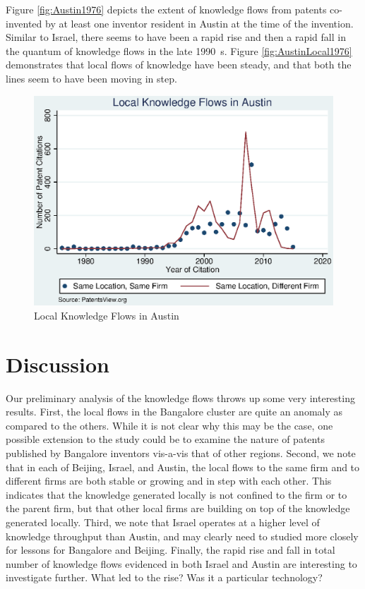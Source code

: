 \documentclass[12pt]{article}
\begin{document}
Figure \ref{fig:Austin1976} depicts the extent of knowledge flows from patents co-invented by at least one inventor resident in Austin at the time of the invention. Similar to Israel, there seems to have been a rapid rise and then a rapid fall in the quantum of knowledge flows in the late 1990\textquotesingle\ s. Figure \ref{fig:AustinLocal1976} demonstrates that local flows of knowledge have been steady, and that both the lines seem to have been moving in step.

\begin{figure}[h]
\begin{centering}
  \includegraphics[width=\textwidth]{AustinLocal1976}
  \caption{Local Knowledge Flows in Austin}
  \label{fig:AustinlLocal1976}
\end{centering}
\end{figure}

\section{Discussion}
Our preliminary analysis of the knowledge flows throws up some very interesting results. First, the local flows in the Bangalore cluster are quite an anomaly as compared to the others. While it is not clear why this may be the case, one possible extension to the study could be to examine the nature of patents published by Bangalore inventors vis-a-vis that of other regions. Second, we note that in each of Beijing, Israel, and Austin, the local flows to the same firm and to different firms are both stable or growing and in step with each other. This indicates that the knowledge generated locally is not confined to the firm or to the parent firm, but that other local firms are building on top of the knowledge generated locally. Third, we note that Israel operates at a higher level of knowledge throughput than Austin, and may clearly need to studied more closely for lessons for Bangalore and Beijing. Finally, the rapid rise and fall in total number of knowledge flows evidenced in both Israel and Austin are interesting to investigate further. What led to the rise? Was it a particular technology?
\end{document}

